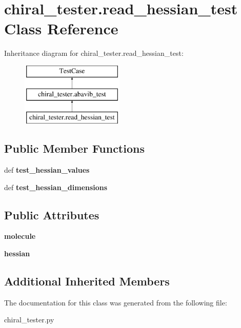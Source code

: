 \hypertarget{classchiral__tester_1_1read__hessian__test}{\section{chiral\+\_\+tester.\+read\+\_\+hessian\+\_\+test Class Reference}
\label{classchiral__tester_1_1read__hessian__test}
}
Inheritance diagram for chiral\+\_\+tester.\+read\+\_\+hessian\+\_\+test\+:\begin{figure}[H]
\begin{center}
\leavevmode
\includegraphics[height=3.000000cm]{classchiral__tester_1_1read__hessian__test}
\end{center}
\end{figure}
\subsection*{Public Member Functions}
\begin{DoxyCompactItemize}
\item 
\hypertarget{classchiral__tester_1_1read__hessian__test_a209352cb6d8ff61c1b974c8c61ea1448}{def {\bfseries test\+\_\+hessian\+\_\+values}}\label{classchiral__tester_1_1read__hessian__test_a209352cb6d8ff61c1b974c8c61ea1448}

\item 
\hypertarget{classchiral__tester_1_1read__hessian__test_a4ee8127bdcca475c42eb8e209e3601a6}{def {\bfseries test\+\_\+hessian\+\_\+dimensions}}\label{classchiral__tester_1_1read__hessian__test_a4ee8127bdcca475c42eb8e209e3601a6}

\end{DoxyCompactItemize}
\subsection*{Public Attributes}
\begin{DoxyCompactItemize}
\item 
\hypertarget{classchiral__tester_1_1read__hessian__test_a4e0900d43d3cd8b6e02233b350b145fd}{{\bfseries molecule}}\label{classchiral__tester_1_1read__hessian__test_a4e0900d43d3cd8b6e02233b350b145fd}

\item 
\hypertarget{classchiral__tester_1_1read__hessian__test_a8a2cf17bff86d2f232645b635998d405}{{\bfseries hessian}}\label{classchiral__tester_1_1read__hessian__test_a8a2cf17bff86d2f232645b635998d405}

\end{DoxyCompactItemize}
\subsection*{Additional Inherited Members}


The documentation for this class was generated from the following file\+:\begin{DoxyCompactItemize}
\item 
chiral\+\_\+tester.\+py\end{DoxyCompactItemize}

